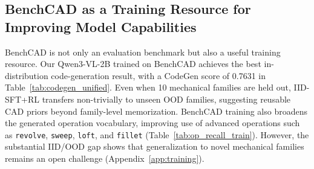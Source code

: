 \subsection{BenchCAD as a Training Resource for Improving Model Capabilities}
\label{sec:results_training}

BenchCAD is not only an evaluation benchmark but also a useful training resource. Our Qwen3-VL-2B trained on BenchCAD achieves the best in-distribution code-generation result, with a CodeGen score of 0.7631 in Table~\ref{tab:codegen_unified}. Even when 10 mechanical families are held out, IID-SFT+RL transfers non-trivially to unseen OOD families, suggesting reusable CAD priors beyond family-level memorization. BenchCAD training also broadens the generated operation vocabulary, improving use of advanced operations such as \texttt{revolve}, \texttt{sweep}, \texttt{loft}, and \texttt{fillet} (Table~\ref{tab:op_recall_train}). However, the substantial IID/OOD gap shows that generalization to novel mechanical families remains an open challenge (Appendix~\ref{app:training}).

